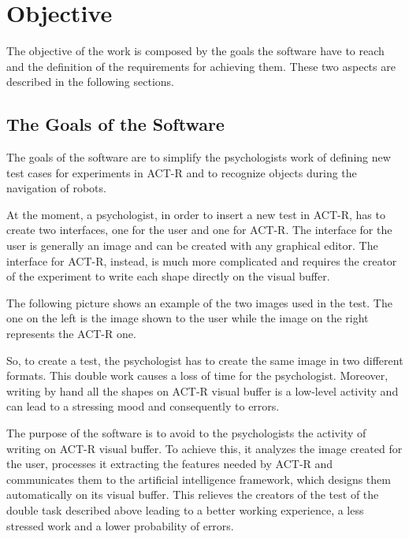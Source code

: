 \chapter{Objective}

The objective of the work is composed by the goals the software have to reach and the definition of the requirements for achieving them. These two aspects are described in the following sections.

	\section{The Goals of the Software}
\begin{comment}to be developed\end{comment}
	The goals of the software  are to simplify the psychologists work of defining new test cases for experiments in ACT-R and to recognize objects during the navigation of robots.

	At the moment, a psychologist, in order to insert a new test in ACT-R, has to create two interfaces, one for the user and one for ACT-R.
	The interface for the user is generally an image and can be created with any graphical editor. 
	The interface for ACT-R, instead, is much more complicated and requires the creator of the experiment to write each shape directly on the visual buffer.  
	
	The following picture shows an example of the two images used in the test.
	The one on the left is the image shown to the user while the image on the right represents the ACT-R one. 


	So, to create a test, the psychologist has to create the same image in two different formats.
	This double work causes a loss of time for the psychologist. Moreover, writing by hand all the shapes on ACT-R visual buffer is a low-level activity and can lead to a stressing mood and consequently to errors.

\begin{comment}to be developed\end{comment}
	The purpose of the software is to avoid to the psychologists the activity of writing on ACT-R visual buffer. To achieve this, it analyzes the image created for the user, processes it extracting the features needed by ACT-R and communicates them to the artificial intelligence framework, which designs them automatically on its visual buffer. 
	This relieves the creators of the test of the double task described above leading to a better working experience, a less stressed work and a lower probability of errors.
	

